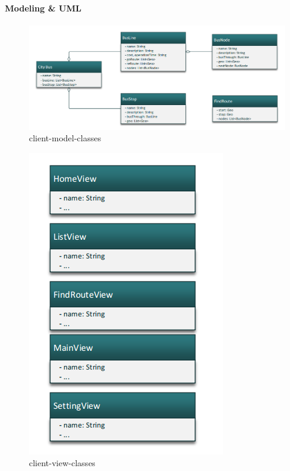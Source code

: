 		\paragraph{Modeling \& UML}
			\begin{figure}[H]
				\centering
				\includegraphics[scale=0.6]{Chapters/Fig/client-model-classes.png}
				\caption{client-model-classes}
				\label{fig:architecture-of-webservice}
			\end{figure}
			\begin{figure}[H]
				\centering
				\includegraphics[scale=0.7]{Chapters/Fig/client-view-classes.png}
				\caption{client-view-classes}
				\label{fig:architecture-of-webservice}
			\end{figure}
